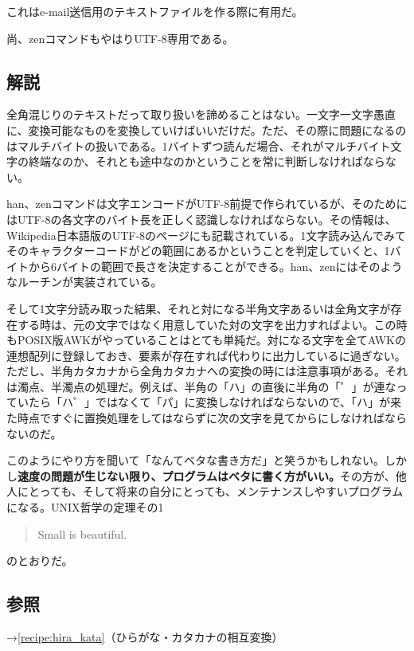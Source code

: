 これはe-mail送信用のテキストファイルを作る際に有用だ。

尚、zenコマンドもやはりUTF-8専用である。

\subsection*{解説}

全角混じりのテキストだって取り扱いを諦めることはない。一文字一文字愚直に、変換可能なものを変換していけばいいだけだ。ただ、その際に問題になるのはマルチバイトの扱いである。1バイトずつ読んだ場合、それがマルチバイト文字の終端なのか、それとも途中なのかということを常に判断しなければならない。

han、zenコマンドは文字エンコードがUTF-8前提で作られているが、そのためにはUTF-8の各文字のバイト長を正しく認識しなければならない。その情報は、Wikipedia日本語版のUTF-8のページにも記載されている。1文字読み込んでみてそのキャラクターコードがどの範囲にあるかということを判定していくと、1バイトから6バイトの範囲で長さを決定することができる。han、zenにはそのようなルーチンが実装されている。

そして1文字分読み取った結果、それと対になる半角文字あるいは全角文字が存在する時は、元の文字ではなく用意していた対の文字を出力すればよい。この時もPOSIX版AWKがやっていることはとても単純だ。対になる文字を全てAWKの連想配列に登録しておき、要素が存在すれば代わりに出力しているに過ぎない。ただし、半角カタカナから全角カタカナへの変換の時には注意事項がある。それは濁点、半濁点の処理だ。例えば、半角の「ハ」の直後に半角の「゜」が連なっていたら「ハ゜」ではなくて「パ」に変換しなければならないので、「ハ」が来た時点ですぐに置換処理をしてはならずに次の文字を見てからにしなければならないのだ。

このようにやり方を聞いて「なんてベタな書き方だ」と笑うかもしれない。しかし\textbf{速度の問題が生じない限り、プログラムはベタに書く方がいい。}その方が、他人にとっても、そして将来の自分にとっても、メンテナンスしやすいプログラムになる。UNIX哲学の定理その1
\begin{quote}
	Small is beautiful.
\end{quote}
のとおりだ。

\subsection*{参照}

\noindent
→\ref{recipe:hira_kata}（ひらがな・カタカナの相互変換）
